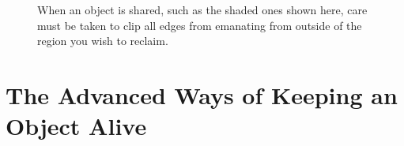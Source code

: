 \begin{figure}
\centering
{}
\qquad
{}
	\caption{When an object is shared, such as the shaded ones shown
	here, care must be taken to clip all edges from emanating from outside of the
	region you wish to reclaim.}
	\label{fig:reachability-sharing}
\end{figure}

\section{The Advanced Ways of Keeping an Object Alive}
\label{sec:advanced-lifetime-features}

